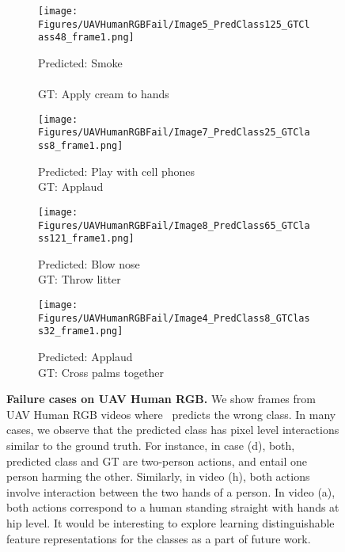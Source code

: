 \documentclass[runningheads]{llncs}
\begin{document}
\begin{figure*}[t]
    \begin{subfigure}[b]{0.24\textwidth}
    \texttt{[image: Figures/UAVHumanRGBFail/Image5\_PredClass125\_GTClass48\_frame1.png]}
    \caption{Predicted: Smoke \\ \\ GT: Apply cream to hands}
    \end{subfigure}
    \begin{subfigure}[b]{0.24\textwidth}
    \texttt{[image: Figures/UAVHumanRGBFail/Image7\_PredClass25\_GTClass8\_frame1.png]}
    \caption{Predicted: Play with cell phones \\ GT: Applaud \\}
    \end{subfigure}
    \begin{subfigure}[b]{0.24\textwidth}
    \texttt{[image: Figures/UAVHumanRGBFail/Image8\_PredClass65\_GTClass121\_frame1.png]}
    \caption{Predicted: Blow nose \\ GT: Throw litter \\}
    \end{subfigure}
    \begin{subfigure}[b]{0.24\textwidth}
    \texttt{[image: Figures/UAVHumanRGBFail/Image4\_PredClass8\_GTClass32\_frame1.png]}
    \caption{Predicted: Applaud \\ GT: Cross palms together}
    \end{subfigure}
    \caption{\textbf{Failure cases on UAV Human RGB.} We show frames from UAV Human RGB videos where \model~predicts the wrong class. In many cases, we observe that the predicted class has pixel level interactions similar to the ground truth. For instance, in case (d), both, predicted class and GT are two-person actions, and entail one person harming the other. Similarly, in video (h), both actions involve interaction between the two hands of a person. In video (a), both actions correspond to a human standing straight with hands at hip level. It would be interesting to explore learning distinguishable feature representations for the  classes as a part of future work.}
    \label{fig:fail_uavhumanrgb}
    
\end{figure*}

 


\end{document}
